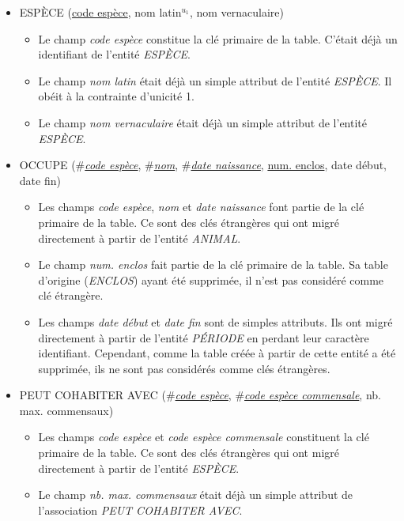 \documentclass[a4paper]{article}
\newcommand{\relat}[1]{\textsc{#1}}
\newcommand{\attr}[1]{#1}
\newcommand{\prim}[1]{\uline{#1}}
\newcommand{\foreign}[1]{\#\textsl{#1}}
\begin{document}
\begin{itemize}
  \item \relat{ESPÈCE} (\prim{code espèce}, \attr{nom latin}$^{u_1}$, \attr{nom vernaculaire})
  \begin{itemize}
    \item Le champ \emph{code espèce} constitue la clé primaire de la table. C'était déjà un identifiant de l'entité \emph{ESPÈCE}.
    \item Le champ \emph{nom latin} était déjà un simple attribut de l'entité \emph{ESPÈCE}. Il obéit à la contrainte d'unicité 1.
    \item Le champ \emph{nom vernaculaire} était déjà un simple attribut de l'entité \emph{ESPÈCE}.
  \end{itemize}

  \item \relat{OCCUPE} (\foreign{\prim{code espèce}}, \foreign{\prim{nom}}, \foreign{\prim{date naissance}}, \prim{num. enclos}, \attr{date début}, \attr{date fin})
  \begin{itemize}
    \item Les champs \emph{code espèce}, \emph{nom} et \emph{date naissance} font partie de la clé primaire de la table. Ce sont des clés étrangères qui ont migré directement à partir de l'entité \emph{ANIMAL}.
    \item Le champ \emph{num. enclos} fait partie de la clé primaire de la table. Sa table d'origine (\emph{ENCLOS}) ayant été supprimée, il n'est pas considéré comme clé étrangère.
    \item Les champs \emph{date début} et \emph{date fin} sont de simples attributs. Ils ont migré directement à partir de l'entité \emph{PÉRIODE} en perdant leur caractère identifiant. Cependant, comme la table créée à partir de cette entité a été supprimée, ils ne sont pas considérés comme clés étrangères.
  \end{itemize}

  \item \relat{PEUT COHABITER AVEC} (\foreign{\prim{code espèce}}, \foreign{\prim{code espèce commensale}}, \attr{nb. max. commensaux})
  \begin{itemize}
    \item Les champs \emph{code espèce} et \emph{code espèce commensale} constituent la clé primaire de la table. Ce sont des clés étrangères qui ont migré directement à partir de l'entité \emph{ESPÈCE}.
    \item Le champ \emph{nb. max. commensaux} était déjà un simple attribut de l'association \emph{PEUT COHABITER AVEC}.
  \end{itemize}


\end{itemize}
\end{document}
